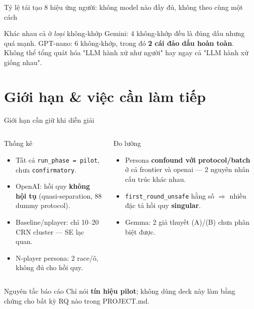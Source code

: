 \documentclass[9pt,aspectratio=169]{beamer}
\newcommand{\bad}[1]{\textcolor{RaceRed}{\textbf{#1}}}
\begin{document}
\begin{frame}{Tỷ lệ tái tạo 8 hiệu ứng người: không model nào đầy đủ, không theo cùng một cách}
\centering
{}
\begin{exampleblock}{Khác nhau cả ở \textit{loại} không-khớp}
\small Gemini: 4 không-khớp đều là đúng dấu nhưng quá mạnh. GPT-nano: 6 không-khớp, trong đó \bad{2 cái đảo dấu hoàn toàn}. Không thể tổng quát hóa "LLM hành xử như người" hay ngay cả "LLM hành xử giống nhau".
\end{exampleblock}
\end{frame}

\section{Giới hạn \& việc cần làm tiếp}

\begin{frame}{Giới hạn cần giữ khi diễn giải}
\begin{columns}[T]
\begin{alertblock}{Thống kê}
\small
\begin{itemize}\setlength\itemsep{2pt}
\item Tất cả \texttt{run\_phase = pilot}, chưa \texttt{confirmatory}.
\item OpenAI: hồi quy \bad{không hội tụ} (quasi-separation, 88 dummy protocol).
\item Baseline/nplayer: chỉ 10--20 CRN cluster --- SE lạc quan.
\item N-player persona: 2 race/ô, không đủ cho hồi quy.
\end{itemize}
\end{alertblock}
\begin{alertblock}{Đo lường}
\small
\begin{itemize}\setlength\itemsep{2pt}
\item Persona \bad{confound với protocol/batch} ở cả frontier và openai --- 2 nguyên nhân cấu trúc khác nhau.
\item \texttt{first\_round\_unsafe} hằng số $\Rightarrow$ nhiều đặc tả hồi quy \textbf{singular}.
\item Gemma: 2 giả thuyết (A)/(B) chưa phân biệt được.
\end{itemize}
\end{alertblock}
\end{columns}
\vspace{0.4em}
\begin{exampleblock}{Nguyên tắc báo cáo}
\small Chỉ nói \textbf{tín hiệu pilot}; không dùng deck này làm bằng chứng cho bất kỳ RQ nào trong PROJECT.md.
\end{exampleblock}
\end{frame}
\end{document}
